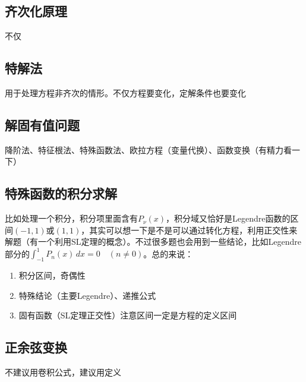 \documentclass[]{report}
\begin{document}
		\subsection{齐次化原理}
		不仅
		\subsection{特解法}
		用于处理方程非齐次的情形。不仅方程要变化，定解条件也要变化
		\subsection{解固有值问题}
		降阶法、特征根法、特殊函数法、欧拉方程（变量代换）、函数变换（有精力看一下）
		\subsection{特殊函数的积分求解}
		比如处理一个积分，积分项里面含有$P_\nu(x)$，积分域又恰好是Legendre函数的区间$(-1,1)$或$(1,1)$，其实可以想一下是不是可以通过转化方程，利用正交性来解题（有一个利用SL定理的概念）。不过很多题也会用到一些结论，比如Legendre部分的$\displaystyle\int_{-1}^1P_n(x)\,dx=0\quad(n\neq0)$。总的来说：\par
		\begin{enumerate}
			\item 积分区间，奇偶性
			\item 特殊结论（主要Legendre）、递推公式
			\item 固有函数（SL定理正交性）注意区间一定是方程的定义区间
		\end{enumerate}
		\subsection{正余弦变换}
		不建议用卷积公式，建议用定义
\end{document}
